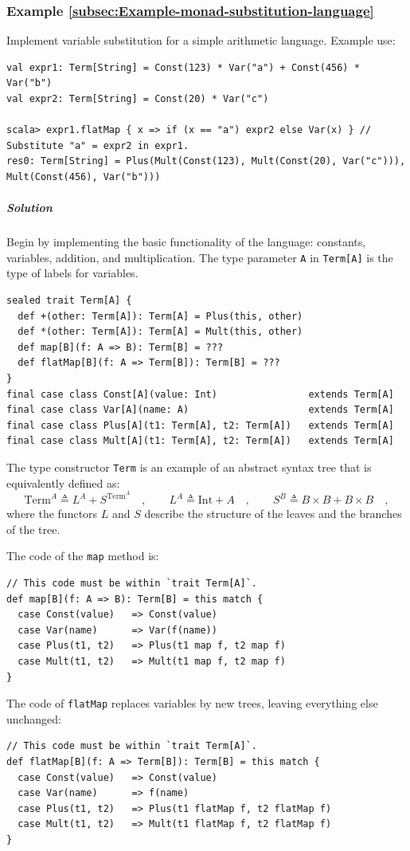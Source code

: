 \subsubsection{Example \label{subsec:Example-monad-substitution-language}\ref{subsec:Example-monad-substitution-language}}

Implement variable substitution for a simple arithmetic language.
Example use:
\begin{lstlisting}
val expr1: Term[String] = Const(123) * Var("a") + Const(456) * Var("b")
val expr2: Term[String] = Const(20) * Var("c")

scala> expr1.flatMap { x => if (x == "a") expr2 else Var(x) } // Substitute "a" = expr2 in expr1.
res0: Term[String] = Plus(Mult(Const(123), Mult(Const(20), Var("c"))), Mult(Const(456), Var("b"))) 
\end{lstlisting}


\subparagraph{Solution}

Begin by implementing the basic functionality of the language: constants,
variables, addition, and multiplication. The type parameter \lstinline!A!
in \lstinline!Term[A]! is the type of labels for variables. 
\begin{lstlisting}
sealed trait Term[A] {
  def +(other: Term[A]): Term[A] = Plus(this, other)
  def *(other: Term[A]): Term[A] = Mult(this, other)
  def map[B](f: A => B): Term[B] = ???
  def flatMap[B](f: A => Term[B]): Term[B] = ???
}
final case class Const[A](value: Int)                extends Term[A]
final case class Var[A](name: A)                     extends Term[A]
final case class Plus[A](t1: Term[A], t2: Term[A])   extends Term[A]
final case class Mult[A](t1: Term[A], t2: Term[A])   extends Term[A]
\end{lstlisting}
The type constructor \lstinline!Term! is an example of an abstract
syntax tree that is equivalently defined
as:
\[
\text{Term}^{A}\triangleq L^{A}+S^{\text{Term}^{A}}\quad,\quad\quad L^{A}\triangleq\text{Int}+A\quad,\quad\quad S^{B}\triangleq B\times B+B\times B\quad,
\]
where the functors $L$ and $S$ describe the structure of the leaves
and the branches of the tree.

The code of the \lstinline!map! method is:
\begin{lstlisting}
// This code must be within `trait Term[A]`.
def map[B](f: A => B): Term[B] = this match {
  case Const(value)   => Const(value)
  case Var(name)      => Var(f(name))
  case Plus(t1, t2)   => Plus(t1 map f, t2 map f)
  case Mult(t1, t2)   => Mult(t1 map f, t2 map f)
}
\end{lstlisting}
The code of \lstinline!flatMap! replaces variables by new trees,
leaving everything else unchanged:
\begin{lstlisting}
// This code must be within `trait Term[A]`.
def flatMap[B](f: A => Term[B]): Term[B] = this match {
  case Const(value)   => Const(value)
  case Var(name)      => f(name)
  case Plus(t1, t2)   => Plus(t1 flatMap f, t2 flatMap f)
  case Mult(t1, t2)   => Mult(t1 flatMap f, t2 flatMap f)
}
\end{lstlisting}

